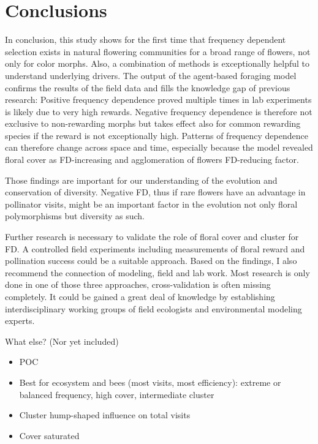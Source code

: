 \section{Conclusions}
\label{ch:conclusions}
In conclusion, this study shows for the first time that frequency dependent selection exists in natural flowering communities for a broad range of flowers, not only for color morphs. Also, a combination of methods is exceptionally helpful to understand underlying drivers. The output of the agent-based foraging model confirms the results of the field data and fills the knowledge gap of previous research: Positive frequency dependence proved multiple times in lab experiments is likely due to very high rewards. Negative frequency dependence is therefore not exclusive to non-rewarding morphs but takes effect also for common rewarding species if the reward is not exceptionally high. Patterns of frequency dependence can therefore change across space and time, especially because the model revealed floral cover as FD-increasing and agglomeration of flowers FD-reducing factor.

Those findings are important for our understanding of the evolution and conservation of diversity. Negative FD, thus if rare flowers have an advantage in pollinator visits, might be an important factor in the evolution not only floral polymorphisms but diversity as such. 

Further research is necessary to validate the role of floral cover and cluster for FD. A controlled field experiments including measurements of floral reward and pollination success could be a suitable approach. Based on the findings, I also recommend the connection of modeling, field and lab work. Most research is only done in one of those three approaches, cross-validation is often missing completely. It could be gained a great deal of knowledge by establishing interdisciplinary working groups of field ecologists and environmental modeling experts. 



What else? (Nor yet included)
\begin{itemize}
	\item POC
	\item Best for ecosystem and bees (most visits, most efficiency): extreme or balanced frequency, high cover, intermediate cluster
	\item Cluster hump-shaped influence on total visits
	\item Cover saturated	
\end{itemize}
